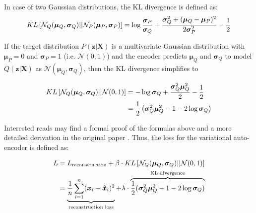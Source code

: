 In case of two Gaussian distributions, the KL divergence is defined as:
\begin{equation}\eqlbl{hso_4}
	KL\left[ \mathcal{N}_Q(\boldsymbol{\mu}_Q, \boldsymbol{\sigma}_Q)||\mathcal{N}_P(\boldsymbol{\mu}_P, \boldsymbol{\sigma}_P) \right] = \log \frac{\boldsymbol{\sigma}_P}{\boldsymbol{\sigma}_Q} + \frac{\boldsymbol{\sigma}_Q^2 + (\boldsymbol{\mu}_Q-\boldsymbol{\mu}_P)^2}{2\boldsymbol{\sigma}_P^2} - \frac{1}{2}
\end{equation}


If the target distribution $P(\boldsymbol{z}|\boldsymbol{X})$ is a multivariate Gaussian distribution with $\boldsymbol{\mu}_P = 0$ and $\boldsymbol{\sigma}_P=1$ (i.e. $\mathcal{N}(0, 1)$) and the encoder predicts $\boldsymbol{\mu}_Q$ and $\boldsymbol{\sigma}_Q$ to model $Q(\boldsymbol{z}|\boldsymbol{X})$ as $\mathcal{N}(\boldsymbol{\mu}_Q, \boldsymbol{\sigma}_Q)$, then the KL divergence simplifies to

\begin{equation*}\eqlbl{hso_5}
\begin{split}
		KL \left[ \mathcal{N}_Q(\boldsymbol{\mu}_Q, \boldsymbol{\sigma}_Q)||\mathcal{N}(0, 1) \right] & = -\log \boldsymbol{\sigma}_Q + \frac{\boldsymbol{\sigma}_Q^2 \boldsymbol{\mu}_Q^2}{2} - \frac{1}{2} \\
			& = \frac{1}{2} \left( \boldsymbol{\sigma}_Q^2 \boldsymbol{\mu}_Q^2 - 1 - 2\log \boldsymbol{\sigma}_Q \right)
\end{split}
\end{equation*}

Interested reads may find a formal proof of the formulas above and a more detailed derivation in the original paper \cite{Kingma_Welling_2014}.
Thus, the loss for the variational auto-encoder is defined as:


\begin{equation*}\eqlbl{hso_6}
\begin{split}
		L & = L_{\text{reconstruction}} + \beta \cdot KL \left[ \mathcal{N}_Q(\boldsymbol{\mu}_Q, \boldsymbol{\sigma}_Q)||\mathcal{N}(0, 1) \right] \\
		  & = \underbrace{\frac{1}{n} \sum_{i=1}^{n} (\boldsymbol{x}_i - \boldsymbol{\hat{x}}_i)^2}_{\text{reconstruction loss}} + \lambda \cdot \overbrace{\frac{1}{2} (\boldsymbol{\sigma}_Q^2 \boldsymbol{\mu}_Q^2 - 1 - 2\log \boldsymbol{\sigma}_Q)}^{\text{KL divergence}}
\end{split}
\end{equation*}

